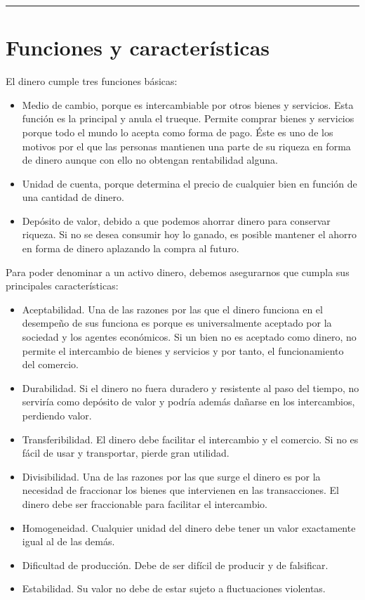\documentclass[
]{krantz}
\providecommand{\tightlist}{%
  \setlength{\itemsep}{0pt}\setlength{\parskip}{0pt}}
\begin{document}
\begin{center}\rule{0.5\linewidth}{0.5pt}\end{center}

\hypertarget{funciones-y-caracteruxedsticas}{%
\section{Funciones y características}\label{funciones-y-caracteruxedsticas}}

El dinero cumple tres funciones básicas:

\begin{itemize}
\tightlist
\item
  Medio de cambio, porque es intercambiable por otros bienes y servicios. Esta función es la principal y anula el trueque. Permite comprar bienes y servicios porque todo el mundo lo acepta como forma de pago. Éste es uno de los motivos por el que las personas mantienen una parte de su riqueza en forma de dinero aunque con ello no obtengan rentabilidad alguna.
\item
  Unidad de cuenta, porque determina el precio de cualquier bien en función de una cantidad de dinero.
\item
  Depósito de valor, debido a que podemos ahorrar dinero para conservar riqueza. Si no se desea consumir hoy lo ganado, es posible mantener el ahorro en forma de dinero aplazando la compra al futuro.
\end{itemize}

Para poder denominar a un activo dinero, debemos asegurarnos que cumpla sus principales características:

\begin{itemize}
\tightlist
\item
  Aceptabilidad. Una de las razones por las que el dinero funciona en el desempeño de sus funciona es porque es universalmente aceptado por la sociedad y los agentes económicos. Si un bien no es aceptado como dinero, no permite el intercambio de bienes y servicios y por tanto, el funcionamiento del comercio.
\item
  Durabilidad. Si el dinero no fuera duradero y resistente al paso del tiempo, no serviría como depósito de valor y podría además dañarse en los intercambios, perdiendo valor.
\item
  Transferibilidad. El dinero debe facilitar el intercambio y el comercio. Si no es fácil de usar y transportar, pierde gran utilidad.
\item
  Divisibilidad. Una de las razones por las que surge el dinero es por la necesidad de fraccionar los bienes que intervienen en las transacciones. El dinero debe ser fraccionable para facilitar el intercambio.
\item
  Homogeneidad. Cualquier unidad del dinero debe tener un valor exactamente igual al de las demás.
\item
  Dificultad de producción. Debe de ser difícil de producir y de falsificar.
\item
  Estabilidad. Su valor no debe de estar sujeto a fluctuaciones violentas.
\end{itemize}
\end{document}
